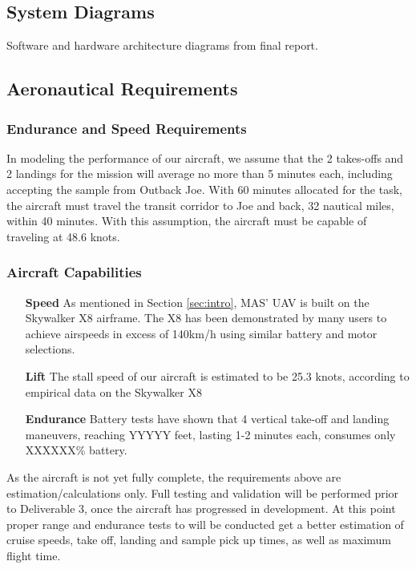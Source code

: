 \subsection{System Diagrams}
Software and hardware architecture diagrams from final report.

\subsection{Aeronautical Requirements}
\subsubsection{Endurance and Speed Requirements}
In modeling the performance of our aircraft, we assume that the 2 takes-offs and 2 landings for the mission will average no more than 5 minutes each, including accepting the sample from Outback Joe. With 60 minutes allocated for the task, the aircraft must travel the transit corridor to Joe and back, 32 nautical miles, within 40 minutes. With this assumption, the aircraft must be capable of traveling at 48.6 knots. 

\subsubsection{Aircraft Capabilities}
\begin{itemize}
	\item[\textbf{Speed}] As mentioned in Section \ref{sec:intro}, MAS' UAV is built on the Skywalker X8 airframe. The X8 has been demonstrated by many users to achieve airspeeds in excess of 140km/h using similar battery and motor selections.
	\item[\textbf{Lift}] The stall speed of our aircraft is estimated to be 25.3 knots, according to empirical data on the Skywalker X8
	\item[\textbf{Endurance}] Battery tests have shown that 4 vertical take-off and landing maneuvers, reaching YYYYY feet, lasting 1-2 minutes each, consumes only XXXXXX\% battery. 
\end{itemize}

As the aircraft is not yet fully complete, the requirements above are estimation/calculations only. Full testing and validation will be performed prior to Deliverable 3, once the aircraft has progressed in development. At this point proper range and endurance tests to will be conducted get a better estimation of cruise speeds, take off, landing and sample pick up times, as well as maximum flight time.

